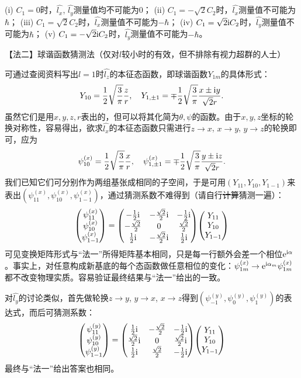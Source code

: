 \begin{enumerate}[label=2.\arabic*, leftmargin=-0.5mm]
(i) $C_1=0$时，$\hat{l_x}$, $\hat{l_y}$测量值均不可能为0；
(ii) $C_1=-\sqrt{2}C_2$时，$\hat{l_x}$测量值不可能为$\hbar$；
(iii) $C_1=\sqrt{2}C_2$时，$\hat{l_x}$测量值不可能为$-\hbar$；
(iv) $C_1=\sqrt{2}\mathrm{i} C_2$时，$\hat{l_y}$测量值不可能为$\hbar$；
(v) $C_1=-\sqrt{2}\mathrm{i} C_2$时，$\hat{l_y}$测量值不可能为$-\hbar$。

【法二】球谐函数猜测法（仅对$l$较小时的有效，但不排除有视力超群的人士）

可通过查阅资料写出$l=1$时$\hat{l_z}$的本征态函数，即球谐函数$Y_{1m}$的具体形式：
\[Y_{10} = \frac{1}{2}\sqrt{\frac{3}{\pi}}\frac{z}{r},\quad
Y_{1,\pm1} = \mp\frac{1}{2}\sqrt{\frac{3}{\pi}}\frac{x\pm \mathrm{i} y}{\sqrt{2}r}.\]
虽然它们是用$x,y,z,r$表出的，但可以将其化简为$\theta,\psi$的函数。由于$x,y,z$坐标的轮换对称性，容易得出，欲求$\hat{l_x}$的本征态函数只需进行$z\rightarrow x$, $x\rightarrow y$, $y\rightarrow z$的轮换即可，应为
\[\psi^{(x)}_{10} = \frac{1}{2}\sqrt{\frac{3}{\pi}}\frac{x}{r},\quad
\psi^{(x)}_{1,\pm1} = \mp\frac{1}{2}\sqrt{\frac{3}{\pi}}\frac{y\pm \mathrm{i} z}{\sqrt{2}r}.\]
我们已知它们可分别作为两组基张成相同的子空间，于是可用$(Y_{11},Y_{10},Y_{1-1})$来表出$(\psi^{(x)}_{11},\psi^{(x)}_{10},\psi^{(x)}_{1-1})$，通过猜测系数不难得到（请自行\sout{计算}猜测一遍）：
\[\mqty(\psi^{(x)}_{11}\\\psi^{(x)}_{10}\\\psi^{(x)}_{1-1})  =
\mqty(-\frac{1}{2}\im&-\frac{\sqrt{2}}{2}\im&-\frac{1}{2}\im\\
-\frac{\sqrt{2}}{2}&0&\frac{\sqrt{2}}{2}\\
\frac{1}{2}\im&-\frac{\sqrt{2}}{2}\im&\frac{1}{2}\im)
\mqty(Y_{11}\\Y_{10}\\Y_{1-1})\]
可见变换矩阵形式与“法一”所得矩阵基本相同，只是每一行额外会差一个相位$\mathrm{e}^{\mathrm{i}\alpha}$。事实上，{\color{red}对任意构成新基底的每个态函数做任意相位的变化：$\psi^{(x)}_{1m}\rightarrow \mathrm{e}^{\mathrm{i}\alpha_m}\psi^{(x)}_{1m}$都不改变物理实质}。容易验证最终结果与“法一”给出的一致。

对$\hat{l_y}$的讨论类似，首先做轮换$z\rightarrow y$, $y\rightarrow x$, $x\rightarrow z$得到$(\psi^{(y)}_{-1},\psi^{(y)}_0,\psi^{(y)}_1)$的表达式，而后可猜测系数：
\[\mqty(\psi^{(y)}_{11}\\\psi^{(y)}_{10}\\\psi^{(y)}_{1-1})  =
\mqty(\frac{1}{2}\im&-\frac{\sqrt{2}}{2}&-\frac{1}{2}\im\\
\frac{\sqrt{2}}{2}\im&0&\frac{\sqrt{2}}{2}\im\\
\frac{1}{2}\im&\frac{\sqrt{2}}{2}&-\frac{1}{2}\im)
\mqty(Y_{11}\\Y_{10}\\Y_{1-1})\]
最终与“法一”给出答案也相同。


\end{enumerate}
